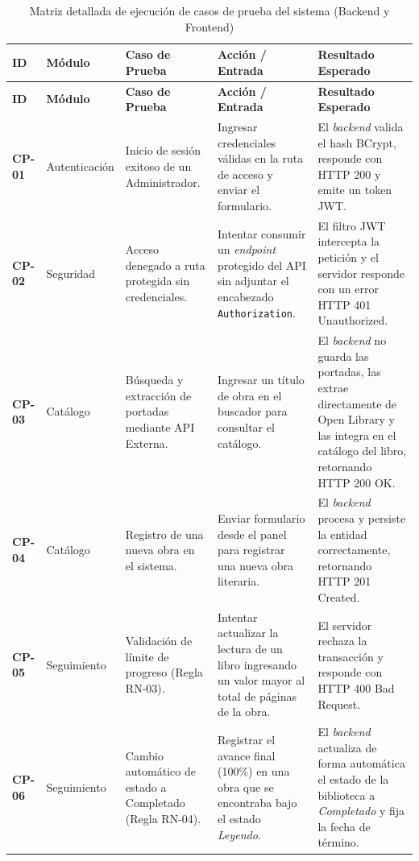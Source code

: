 \documentclass[12pt, atypical, journal]{article}
\begin{document}
\begin{longtable}{|p{1.0cm}|p{2.2cm}|p{3.0cm}|p{3.5cm}|p{3.8cm}|}
	\caption{Matriz detallada de ejecución de casos de prueba del sistema (Backend y Frontend)}
	\label{tab:casos_prueba} \\
	
	\hline
	\textbf{ID} & \textbf{Módulo} & \textbf{Caso de Prueba} & \textbf{Acción / Entrada} & \textbf{Resultado Esperado} \\ \hline
	\endfirsthead
	
	\hline
	\textbf{ID} & \textbf{Módulo} & \textbf{Caso de Prueba} & \textbf{Acción / Entrada} & \textbf{Resultado Esperado} \\ \hline
	\endhead
	
	\textbf{CP-01} & Autenticación & Inicio de sesión exitoso de un Administrador. & Ingresar credenciales válidas en la ruta de acceso y enviar el formulario. & El \textit{backend} valida el hash BCrypt, responde con HTTP 200 y emite un token JWT. \\ \hline
	
	\textbf{CP-02} & Seguridad & Acceso denegado a ruta protegida sin credenciales. & Intentar consumir un \textit{endpoint} protegido del API sin adjuntar el encabezado \texttt{Authorization}. & El filtro JWT intercepta la petición y el servidor responde con un error HTTP 401 Unauthorized. \\ \hline
	
	\textbf{CP-03} & Catálogo & Búsqueda y extracción de portadas mediante API Externa. & Ingresar un título de obra en el buscador para consultar el catálogo. & El \textit{backend} no guarda las portadas, las extrae directamente de Open Library y las integra en el catálogo del libro, retornando HTTP 200 OK. \\ \hline
	
	\textbf{CP-04} & Catálogo & Registro de una nueva obra en el sistema. & Enviar formulario desde el panel para registrar una nueva obra literaria. & El \textit{backend} procesa y persiste la entidad correctamente, retornando HTTP 201 Created. \\ \hline
	
	\textbf{CP-05} & Seguimiento & Validación de límite de progreso (Regla RN-03). & Intentar actualizar la lectura de un libro ingresando un valor mayor al total de páginas de la obra. & El servidor rechaza la transacción y responde con HTTP 400 Bad Request. \\ \hline
	
	\textbf{CP-06} & Seguimiento & Cambio automático de estado a Completado (Regla RN-04). & Registrar el avance final (100\%) en una obra que se encontraba bajo el estado \textit{Leyendo}. & El \textit{backend} actualiza de forma automática el estado de la biblioteca a \textit{Completado} y fija la fecha de término. \\ \hline
	

\end{longtable}
\end{document}
